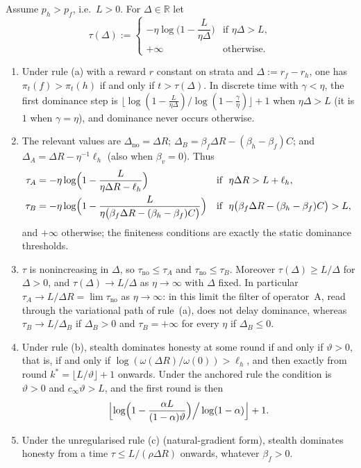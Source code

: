 \begin{corollary}\label{cor:hitting-times}
Assume $p_h>p_f$, i.e.\ $L>0$. For $\Delta\in\mathbb R$ let
\[
\tau(\Delta):=\begin{cases}
-\eta\log\bigl(1-\dfrac{L}{\eta\Delta}\bigr) & \text{if }\eta\Delta>L,\\[1.5ex]
+\infty & \text{otherwise.}
\end{cases}
\]
\begin{enumerate}
\item[\textup{(i)}] Under rule \textup{(a)} with a reward $r$ constant on
strata and $\Delta:=r_f-r_h$, one has $\pi_t(f)>\pi_t(h)$ if and only if
$t>\tau(\Delta)$. In discrete time with $\gamma<\eta$, the first dominance
step is
$\bigl\lfloor\log(1-\tfrac{L}{\eta\Delta})/\log(1-\tfrac{\gamma}{\eta})\bigr\rfloor+1$
when $\eta\Delta>L$ (it is $1$ when $\gamma=\eta$), and dominance never
occurs otherwise.
\item[\textup{(ii)}] The relevant values are
$\Delta_{\mathrm{no}}=\Delta R$;
$\Delta_B=\beta_f\Delta R-(\beta_h-\beta_f)C$; and
$\Delta_A=\Delta R-\eta^{-1}\ell_h$ (also when $\beta_v=0$). Thus
\begin{align*}
\tau_A&=-\eta\log\Bigl(1-\frac{L}{\eta\Delta R-\ell_h}\Bigr)
&&\text{if }\ \eta\Delta R>L+\ell_h,\\
\tau_B&=-\eta\log\Bigl(1-\frac{L}{\eta\bigl(\beta_f\Delta R-(\beta_h-\beta_f)C\bigr)}\Bigr)
&&\text{if }\ \eta\bigl(\beta_f\Delta R-(\beta_h-\beta_f)C\bigr)>L,
\end{align*}
and $+\infty$ otherwise; the finiteness conditions are exactly the static
dominance thresholds.
\item[\textup{(iii)}] $\tau$ is nonincreasing in $\Delta$, so
$\tau_{\mathrm{no}}\le\tau_A$ and $\tau_{\mathrm{no}}\le\tau_B$. Moreover
$\tau(\Delta)\ge L/\Delta$ for $\Delta>0$, and
$\tau(\Delta)\to L/\Delta$ as $\eta\to\infty$ with $\Delta$ fixed. In
particular $\tau_A\to L/\Delta R=\lim\tau_{\mathrm{no}}$ as
$\eta\to\infty$: in this limit the filter of operator~A, read through the variational path of rule~(a), does not delay
dominance, whereas $\tau_B\to L/\Delta_B$ if $\Delta_B>0$ and
$\tau_B=+\infty$ for every $\eta$ if $\Delta_B\le0$.
\item[\textup{(iv)}] Under rule \textup{(b)}, stealth dominates honesty at
some round if and only if $\vartheta>0$, that is, if and only if
$\log(\omega(\Delta R)/\omega(0))>\ell_h$, and then exactly from
round $k^\ast=\lfloor L/\vartheta\rfloor+1$ onwards. Under the anchored rule
the condition is $\vartheta>0$ and $c_\infty\vartheta>L$, and the first
round is then
\[
\Bigl\lfloor\log\Bigl(1-\frac{\alpha L}{(1-\alpha)\vartheta}\Bigr)\Big/\log(1-\alpha)\Bigr\rfloor+1 .
\]
\item[\textup{(v)}] Under the unregularised rule \textup{(c)} (natural-gradient form), stealth
dominates honesty from a time $\tau\le L/(\rho\Delta R)$ onwards, whatever
$\beta_f>0$.
\end{enumerate}
\end{corollary}

